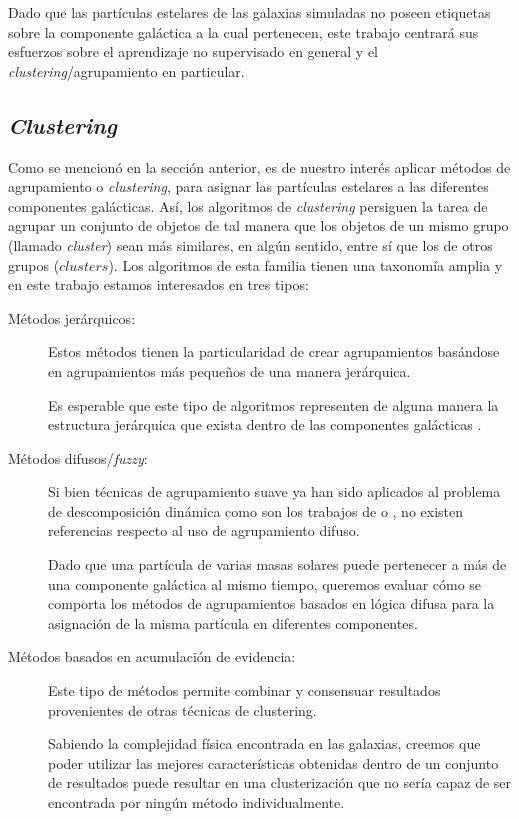 Dado que las partículas estelares de las galaxias simuladas no poseen etiquetas sobre la componente galáctica a la cual pertenecen, este trabajo centrará sus esfuerzos sobre el aprendizaje no supervisado en general y el \textit{clustering}/agrupamiento en particular.

\subsection{\textit{Clustering}}

Como se mencionó en la sección anterior, es de nuestro interés aplicar métodos de agrupamiento o \textit{clustering}, para asignar las partículas estelares a las diferentes componentes galácticas. Así, los algoritmos de \textit{clustering} persiguen la tarea de agrupar un conjunto de objetos de tal manera que los objetos de un mismo grupo (llamado \textit{cluster}) sean más similares, en algún sentido, entre sí que los de otros grupos ($clusters$). Los algoritmos de esta familia tienen una taxonomía amplia y en este trabajo estamos interesados en tres tipos:

\begin{description}
    \item[Métodos jerárquicos: ] Estos métodos tienen la particularidad de crear agrupamientos basándose en agrupamientos más pequeños de una manera jerárquica.  
    
    Es esperable que este tipo de algoritmos representen de alguna manera la estructura jerárquica que exista dentro de las componentes galácticas \citep{johnson1967hierarchical}.

    \item[Métodos difusos/\textit{fuzzy}: ] Si bien técnicas de agrupamiento suave ya han sido aplicados al problema de descomposición dinámica como son los trabajos de \citet{obreja2018introducing} o \citet{du2019identifying}, no existen referencias respecto al uso de agrupamiento difuso. 
    
    Dado que una partícula de varias masas solares puede pertenecer a más de una componente galáctica al mismo tiempo, queremos evaluar cómo se comporta los métodos de agrupamientos basados en lógica difusa para la asignación de la misma partícula en diferentes componentes.

    \item[Métodos basados en acumulación de evidencia: ] Este tipo de métodos permite combinar y consensuar resultados provenientes de otras técnicas de clustering.
    
    Sabiendo la complejidad física encontrada en las galaxias, creemos que poder utilizar las mejores características obtenidas dentro de un conjunto de resultados puede resultar en una clusterización que no sería capaz de ser encontrada por ningún método individualmente.
    
\end{description}


